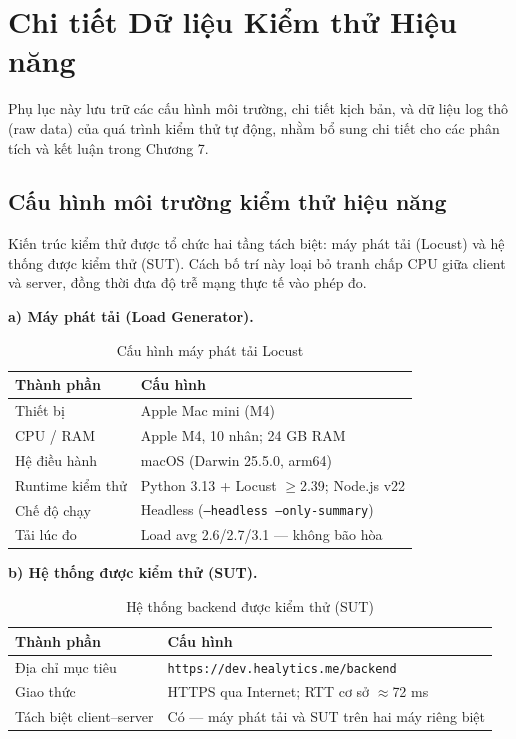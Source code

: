 \chapter{Chi tiết Dữ liệu Kiểm thử Hiệu năng}
\label{appendix:test_raw_data}

Phụ lục này lưu trữ các cấu hình môi trường, chi tiết kịch bản, và dữ liệu log thô (raw data) của quá trình kiểm thử tự động, nhằm bổ sung chi tiết cho các phân tích và kết luận trong Chương 7.

\section{Cấu hình môi trường kiểm thử hiệu năng}

Kiến trúc kiểm thử được tổ chức hai tầng tách biệt: máy phát tải (Locust) và hệ thống được kiểm thử (SUT). Cách bố trí này loại bỏ tranh chấp CPU giữa client và server, đồng thời đưa độ trễ mạng thực tế vào phép đo.

\noindent\textbf{a) Máy phát tải (Load Generator).}

\begin{table}[H]
\centering
\begin{tabularx}{\textwidth}{|p{}|X|}
\hline
\textbf{Thành phần} & \textbf{Cấu hình} \\
\hline
Thiết bị & Apple Mac mini (M4) \\
\hline
CPU / RAM & Apple M4, 10 nhân; 24 GB RAM \\
\hline
Hệ điều hành & macOS (Darwin 25.5.0, arm64) \\
\hline
Runtime kiểm thử & Python 3.13 + Locust $\geq$2.39; Node.js v22 \\
\hline
Chế độ chạy & Headless (\texttt{--headless --only-summary}) \\
\hline
Tải lúc đo & Load avg 2.6/2.7/3.1 --- không bão hòa \\
\hline
\end{tabularx}
\caption{Cấu hình máy phát tải Locust}
\label{tab:perf_load_gen}
\end{table}

\noindent\textbf{b) Hệ thống được kiểm thử (SUT).}

\begin{table}[H]
\centering
\begin{tabularx}{\textwidth}{|p{}|X|}
\hline
\textbf{Thành phần} & \textbf{Cấu hình} \\
\hline
Địa chỉ mục tiêu & \texttt{https://dev.healytics.me/backend} \\
\hline
Giao thức & HTTPS qua Internet; RTT cơ sở $\approx$72 ms \\
\hline
Tách biệt client--server & Có --- máy phát tải và SUT trên hai máy riêng biệt \\
\hline
\end{tabularx}
\caption{Hệ thống backend được kiểm thử (SUT)}
\label{tab:perf_sut}
\end{table}

